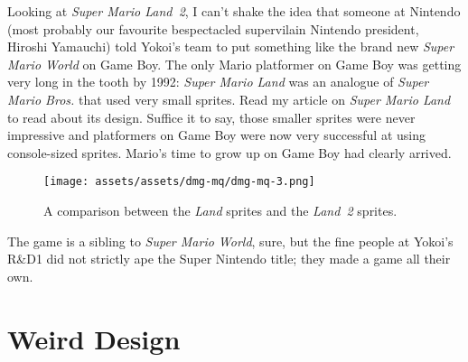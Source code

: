 \documentclass{book}
\begin{document}
Looking at \emph{Super Mario Land 2}, I can’t shake the idea that someone at Nintendo (most probably our favourite bespectacled supervilain Nintendo president, Hiroshi Yamauchi) told Yokoi’s team to put something like the brand new \emph{Super Mario World} on Game Boy. The only Mario platformer on Game Boy was getting very long in the tooth by 1992: \emph{Super Mario Land} was an analogue of \emph{Super Mario Bros.} that used very small sprites. Read my article on \emph{Super Mario Land} to read about its design. Suffice it to say, those smaller sprites were never impressive and platformers on Game Boy were now very successful at using console-sized sprites. Mario’s time to grow up on Game Boy had clearly arrived.

\begin{figure}[hbt]
\vskip 10pt
\centering \texttt{[image: assets/assets/dmg-mq/dmg-mq-3.png]}\par\pagetwodescription A comparison between the \emph{Land} sprites and the \emph{Land 2} sprites.
\vskip 6pt
\end{figure}

The game is a sibling to \emph{Super Mario World}, sure, but the fine people at Yokoi’s R\&D1 did not strictly ape the Super Nintendo title; they made a game all their own.

\FloatBarrier\needspace{10mm}\section*{Weird Design}\nopagebreak[4]
\end{document}
